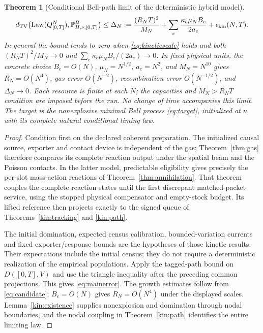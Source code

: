 \documentclass[11pt]{article}
\newtheorem{theorem}{Theorem}[section]
\theoremstyle{definition}\newtheorem{definition}[theorem]{Definition}
\theoremstyle{remark}\newtheorem{remark}[theorem]{Remark}
\newcommand{\Law}{\operatorname{Law}}\newcommand{\TV}{d_{\mathrm{TV}}}
\begin{document}
\begin{theorem}[Conditional Bell-path limit of the deterministic hybrid model]
\begin{equation}
 \TV\bigl(\Law(Q^N_{[0,T]}),\mathbb P^B_{H,\nu,[0,T]}\bigr)
 \le \Delta_N:=\frac{(R_NT)^2}{M_N}
       +\sum_e\frac{\kappa_e\mu_NB_e}{2a_e}
       +\epsilon_{\rm kin}(N,T).
 \label{eq:mainerror}
\end{equation}
In general the bound tends to zero when
\eqref{eq:kineticscale} holds and both
$(R_NT)^2/M_N\to0$ and
$\sum_e\kappa_e\mu_NB_e/(2a_e)\to0$.
In fixed physical units, the concrete choice $B_e=O(N)$,
$\mu_N=N^{1/2}$, $a_e=N^2$, and $M_N=N^{10}$ gives
$R_N=O(N^4)$, gas error $O(N^{-2})$, recombination error
$O(N^{-1/2})$, and $\Delta_N\to0$. Each resource is finite at
each $N$; the capacities and $M_N>R_NT$ condition are imposed
before the run. No change of time accompanies this limit. The target
is the nonexplosive minimal Bell process \eqref{eq:target},
initialized at $\nu$, with its complete natural conditional timing law.
\end{theorem}
\begin{proof}
Condition first on the declared coherent preparation. The initialized
causal source, exporter and contact device is independent of the gas;
Theorem~\ref{thm:gas} therefore compares its complete reaction output
under the spatial beam and the Poisson contacts. In the latter model,
predictable eligibility gives precisely the per-slot mass-action
reactions of Theorem~\ref{thm:annihilation}. That theorem couples
the complete reaction states until the first discrepant matched-packet
service, using the stopped physical compensator and empty-stock
budget. Its lifted reference then projects exactly to the signed queue
of Theorems~\ref{kin:tracking} and \ref{kin:path}.

The initial domination, expected census calibration, bounded-variation
currents and fixed exporter/response bounds are the hypotheses of
those kinetic results. Their expectations include the initial census;
they do not require a deterministic realization of the empirical
populations. Apply the tagged-path bound on $D([0,T],V)$ and use
the triangle inequality after the preceding common projections. This
gives \eqref{eq:mainerror}. The growth estimates follow from
\eqref{eq:candidate}; $B_e=O(N)$ gives $R_N=O(N^4)$ under the
displayed scales. Lemma~\ref{kin:existence} supplies nonexplosion
and domination through nodal boundaries, and the nodal coupling in
Theorem~\ref{kin:path} identifies the entire limiting law.
\end{proof}
\end{document}
